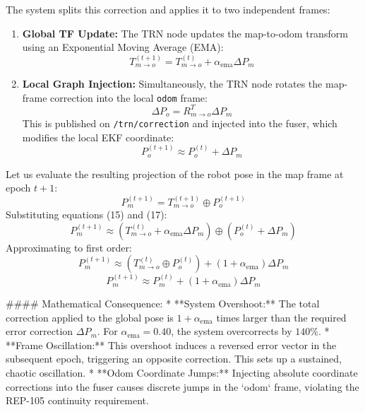 \documentclass[10pt,journal,compsoc]{IEEEtran}
\begin{document}
The system splits this correction and applies it to two independent frames:
\begin{enumerate}
    \item \textbf{Global TF Update:} The TRN node updates the map-to-odom transform using an Exponential Moving Average (EMA):
    \begin{equation}
        T_{m \to o}^{(t+1)} = T_{m \to o}^{(t)} + \alpha_{\text{ema}} \Delta P_m
    \end{equation}
    \item \textbf{Local Graph Injection:} Simultaneously, the TRN node rotates the map-frame correction into the local \texttt{odom} frame:
    \begin{equation}
        \Delta P_o = R_{m \to o}^T \Delta P_m
    \end{equation}
    This is published on \texttt{/trn/correction} and injected into the fuser, which modifies the local EKF coordinate:
    \begin{equation}
        P_o^{(t+1)} \approx P_o^{(t)} + \Delta P_m
    \end{equation}
\end{enumerate}

Let us evaluate the resulting projection of the robot pose in the map frame at epoch $t+1$:
\begin{equation}
    P_m^{(t+1)} = T_{m \to o}^{(t+1)} \oplus P_o^{(t+1)}
\end{equation}
Substituting equations (15) and (17):
\begin{equation}
    P_m^{(t+1)} \approx \left( T_{m \to o}^{(t)} + \alpha_{\text{ema}} \Delta P_m \right) \oplus \left( P_o^{(t)} + \Delta P_m \right)
\end{equation}
Approximating to first order:
\begin{equation}
    P_m^{(t+1)} \approx \left( T_{m \to o}^{(t)} \oplus P_o^{(t)} \right) + (1 + \alpha_{\text{ema}}) \Delta P_m
\end{equation}
\begin{equation}
    P_m^{(t+1)} \approx P_m^{(t)} + (1 + \alpha_{\text{ema}}) \Delta P_m
\end{equation}

#### Mathematical Consequence:
* **System Overshoot:** The total correction applied to the global pose is $1 + \alpha_{\text{ema}}$ times larger than the required error correction $\Delta P_m$. For $\alpha_{\text{ema}} = 0.40$, the system overcorrects by $140\%$.
* **Frame Oscillation:** This overshoot induces a reversed error vector in the subsequent epoch, triggering an opposite correction. This sets up a sustained, chaotic oscillation.
* **Odom Coordinate Jumps:** Injecting absolute coordinate corrections into the fuser causes discrete jumps in the `odom` frame, violating the REP-105 continuity requirement.
\end{document}
